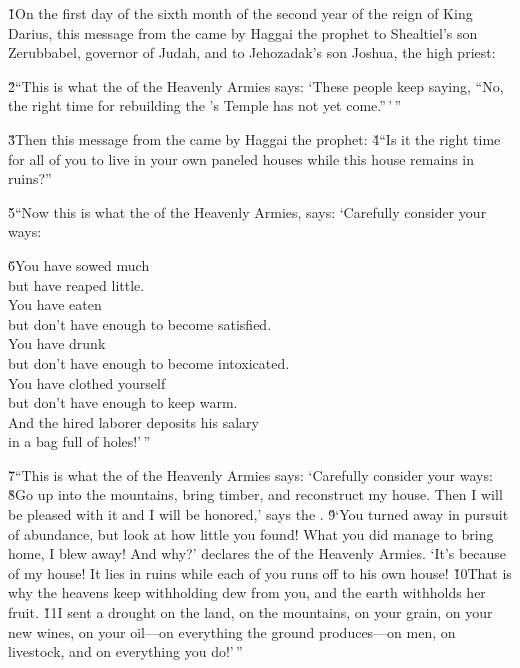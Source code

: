 


\v{1}On the first day of the sixth month of the second year of the reign of King Darius, this message from the  came by Haggai the prophet to Shealtiel's son Zerubbabel, governor of Judah, and to Jehozadak's son Joshua, the high priest:

\v{2}``This is what the  of the Heavenly Armies says: `These people keep saying, ``No, the right time for rebuilding the 's Temple has not yet come.''\,'\,''

\v{3}Then this message from the  came by Haggai the prophet: \v{4}``Is it the right time for all of you to live in your own paneled houses while this house remains in ruins?''

\v{5}``Now this is what the  of the Heavenly Armies, says: `Carefully consider your ways:

\begin{poetry}
\poeml \v{6}You have sowed much \\
\poemll    but have reaped little. \\
\poeml You have eaten \\
\poemll    but don't have enough to become satisfied. \\
\poeml You have drunk \\
\poemll    but don't have enough to become intoxicated. \\
\poeml You have clothed yourself \\
\poemll    but don't have enough to keep warm. \\
\poeml And the hired laborer deposits his salary \\
\poemll    in a bag full of holes!'\,''
\end{poetry}

\v{7}``This is what the  of the Heavenly Armies says: `Carefully consider your ways: \v{8}Go up into the mountains, bring timber, and reconstruct my house. Then I will be pleased with it and I will be honored,' says the . \v{9}`You turned away in pursuit of abundance, but look at how little you found! What you did manage to bring home, I blew away! And why?' declares the  of the Heavenly Armies. `It's because of my house! It lies in ruins while each of you runs off to his own house! \v{10}That is why the heavens keep withholding dew from you, and the earth withholds her fruit. \v{11}I sent a drought on the land, on the mountains, on your grain, on your new wines, on your oil---on everything the ground produces---on men, on livestock, and on everything you do!'\,''


